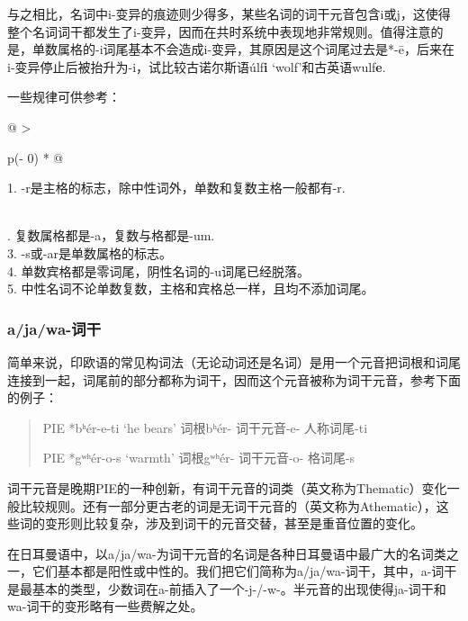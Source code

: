 与之相比，名词中i-变异的痕迹则少得多，某些名词的词干元音包含i或j，这使得整个名词词干都发生了i-变异，因而在共时系统中表现地非常规则。值得注意的是，单数属格的-i词尾基本不会造成i-变异，其原因是这个词尾过去是*-ē，后来在i-变异停止后被抬升为-i，试比较古诺尔斯语úlf\textbf{i}
`wolf'和古英语wulf\textbf{e}.

一些规律可供参考：

\begin{longtable}[]{@{}
  >{\raggedright\arraybackslash}p{(\columnwidth - 0\tabcolsep) * }@{}}
\toprule\noalign{}
\begin{minipage}[b]{\linewidth}\raggedright
1. -r是主格的标志，除中性词外，单数和复数主格一般都有-r.
\end{minipage} \\
\midrule\noalign{}
\endhead
\bottomrule\noalign{}
. 复数属格都是-a，复数与格都是-um. \\
3. -s或-ar是单数属格的标志。 \\
4. 单数宾格都是零词尾，阴性名词的-u词尾已经脱落。 \\
5. 中性名词不论单数复数，主格和宾格总一样，且均不添加词尾。 \\
\end{longtable}

\subsubsection{a/ja/wa-词干}\label{ajawa-ux8bcdux5e72}

简单来说，印欧语的常见构词法（无论动词还是名词）是用一个元音把词根和词尾连接到一起，词尾前的部分都称为词干，因而这个元音被称为词干元音，参考下面的例子：

\begin{quote}
PIE *bʰér-e-ti `he bears' 词根bʰér- 词干元音-e- 人称词尾-ti

PIE *gʷʰér-o-s `warmth' 词根gʷʰér- 词干元音-o- 格词尾-s
\end{quote}

词干元音是晚期PIE的一种创新，有词干元音的词类（英文称为Thematic）变化一般比较规则。还有一部分更古老的词是无词干元音的（英文称为Athematic），这些词的变形则比较复杂，涉及到词干的元音交替，甚至是重音位置的变化。

在日耳曼语中，以a/ja/wa-为词干元音的名词是各种日耳曼语中最广大的名词类之一，它们基本都是阳性或中性的。我们把它们简称为a/ja/wa-词干，其中，a-词干是最基本的类型，少数词在a-前插入了一个-j-/-w-。半元音的出现使得ja-词干和wa-词干的变形略有一些费解之处。

